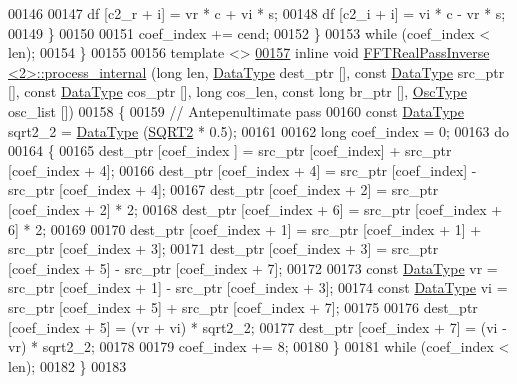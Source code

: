 \begin{DoxyCode}
00146 
00147             df [c2\_r + i] = vr * c + vi * s;
00148             df [c2\_i + i] = vi * c - vr * s;
00149         \}
00150 
00151         coef\_index += cend;
00152     \}
00153     \textcolor{keywordflow}{while} (coef\_index < len);
00154 \}
00155 
00156 \textcolor{keyword}{template} <>
\hypertarget{a00103_source_l00157}{}\hyperlink{a00014_a03beae036e24fa764c21f78afcd00699}{00157} \textcolor{keyword}{inline} \textcolor{keywordtype}{void} \hyperlink{a00014}{FFTRealPassInverse <2>::process\_internal} (\textcolor{keywordtype}{long} len, 
      \hyperlink{a00014_adecc3668f71245ef20a93546a55b3190}{DataType} dest\_ptr [], \textcolor{keyword}{const} \hyperlink{a00014_adecc3668f71245ef20a93546a55b3190}{DataType} src\_ptr [], \textcolor{keyword}{const} \hyperlink{a00014_adecc3668f71245ef20a93546a55b3190}{DataType} cos\_ptr [], \textcolor{keywordtype}{long} 
      cos\_len, \textcolor{keyword}{const} \textcolor{keywordtype}{long} br\_ptr [], \hyperlink{a00020}{OscType} osc\_list [])
00158 \{
00159     \textcolor{comment}{// Antepenultimate pass}
00160     \textcolor{keyword}{const} \hyperlink{a00014_adecc3668f71245ef20a93546a55b3190}{DataType}  sqrt2\_2 = \hyperlink{a00014_adecc3668f71245ef20a93546a55b3190}{DataType} (\hyperlink{a00142_a489004390ad7d791bf53a724c0f07abb}{SQRT2} * 0.5);
00161 
00162     \textcolor{keywordtype}{long}                coef\_index = 0;
00163     \textcolor{keywordflow}{do}
00164     \{
00165         dest\_ptr [coef\_index    ] = src\_ptr [coef\_index] + src\_ptr [coef\_index + 4];
00166         dest\_ptr [coef\_index + 4] = src\_ptr [coef\_index] - src\_ptr [coef\_index + 4];
00167         dest\_ptr [coef\_index + 2] = src\_ptr [coef\_index + 2] * 2;
00168         dest\_ptr [coef\_index + 6] = src\_ptr [coef\_index + 6] * 2;
00169 
00170         dest\_ptr [coef\_index + 1] = src\_ptr [coef\_index + 1] + src\_ptr [coef\_index + 3];
00171         dest\_ptr [coef\_index + 3] = src\_ptr [coef\_index + 5] - src\_ptr [coef\_index + 7];
00172 
00173         \textcolor{keyword}{const} \hyperlink{a00014_adecc3668f71245ef20a93546a55b3190}{DataType}  vr = src\_ptr [coef\_index + 1] - src\_ptr [coef\_index + 3];
00174         \textcolor{keyword}{const} \hyperlink{a00014_adecc3668f71245ef20a93546a55b3190}{DataType}  vi = src\_ptr [coef\_index + 5] + src\_ptr [coef\_index + 7];
00175 
00176         dest\_ptr [coef\_index + 5] = (vr + vi) * sqrt2\_2;
00177         dest\_ptr [coef\_index + 7] = (vi - vr) * sqrt2\_2;
00178 
00179         coef\_index += 8;
00180     \}
00181     \textcolor{keywordflow}{while} (coef\_index < len);
00182 \}
00183 

\end{DoxyCode}
